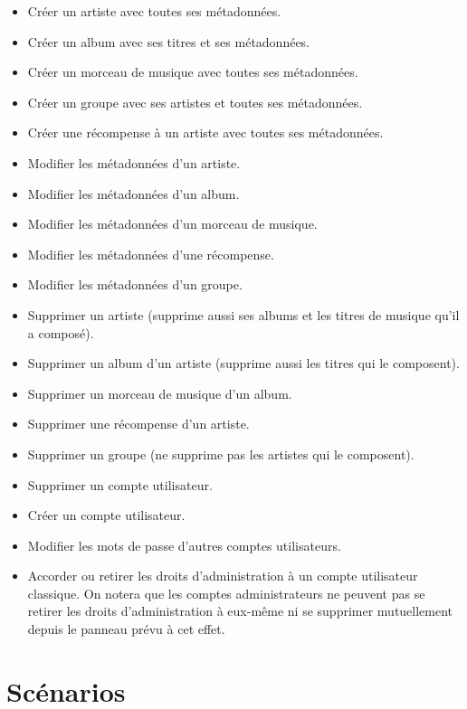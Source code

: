     \begin{paragraphe}
      \begin{itemize}
        \item Créer un artiste avec toutes ses métadonnées.
        \item Créer un album avec ses titres et ses métadonnées.
        \item Créer un morceau de musique avec toutes ses métadonnées.
        \item Créer un groupe avec ses artistes et toutes ses métadonnées.
        \item Créer une récompense à un artiste avec toutes ses métadonnées.
        \item Modifier les métadonnées d'un artiste.
        \item Modifier les métadonnées d'un album.
        \item Modifier les métadonnées d'un morceau de musique.
        \item Modifier les métadonnées d'une récompense.
        \item Modifier les métadonnées d'un groupe.
        \item Supprimer un artiste (supprime aussi ses albums et les titres de
          musique qu'il a composé).
        \item Supprimer un album d'un artiste (supprime aussi les titres qui le composent).
        \item Supprimer un morceau de musique d'un album.
        \item Supprimer une récompense d'un artiste.
        \item Supprimer un groupe (ne supprime pas les artistes qui le composent).
        \item Supprimer un compte utilisateur.
        \item Créer un compte utilisateur.
        \item Modifier les mots de passe d'autres comptes utilisateurs.
        \item Accorder ou retirer les droits d'administration à un compte utilisateur classique.
        On notera que les comptes administrateurs ne peuvent pas se retirer les droits d'administration à eux-même ni se supprimer mutuellement depuis le panneau prévu à cet effet.
      \end{itemize}
    \end{paragraphe}

\section{Scénarios}

